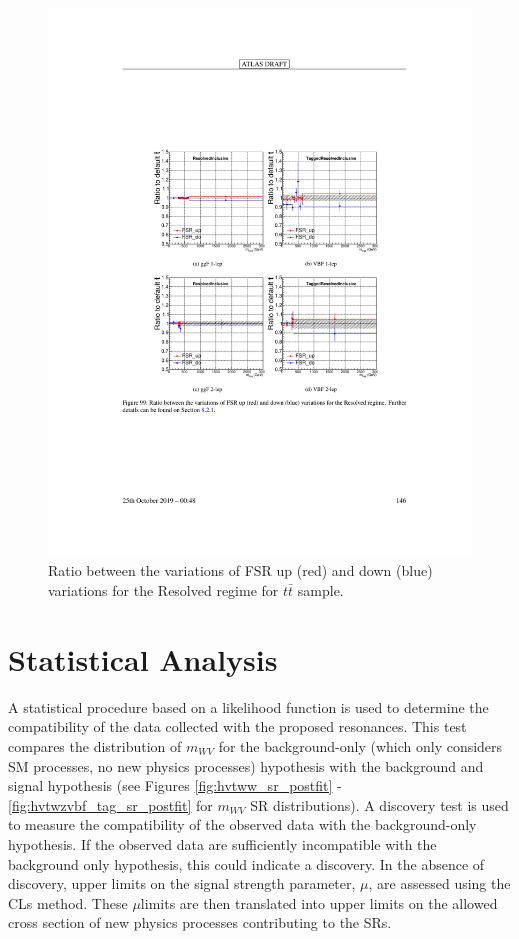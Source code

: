 \begin{figure}[h!]
  \centering
  \includegraphics[width=\hsize]{figures/Analysis/modelingsysts/ttbar_fsr_res.pdf}
            \caption{Ratio between the variations of FSR up (red) and down (blue) variations for the Resolved regime for $t\bar{t}$ sample.} 
  \label{fig:ttbar_fsr_res}
\end{figure} 
\FloatBarrier

\chapter{Statistical Analysis}
A statistical procedure based on a likelihood function is used to determine the compatibility of the data collected with the proposed resonances. This test compares the distribution of $m_{WV}$ for the background-only (which only considers SM processes, no new physics processes) hypothesis with the background and signal hypothesis (see Figures \ref{fig:hvtww_sr_postfit} - \ref{fig:hvtwzvbf_tag_sr_postfit} for $m_{WV}$ SR distributions). A discovery test is used to measure the compatibility of the observed data with the background-only hypothesis. If the observed data are sufficiently incompatible with the background only hypothesis, this could indicate a discovery. In the absence of discovery, upper limits on the signal strength parameter, $\mu$, are assessed using the CLs method. These $\mu$limits are then translated into upper limits on the allowed cross section of new physics processes contributing to the SRs. 

